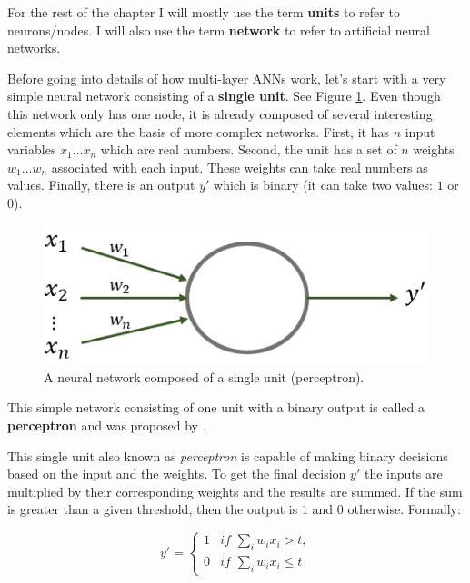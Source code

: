 \documentclass[
  11pt,
]{krantz}
\makeatletter
\newenvironment{kframe}{%
\medskip{}
\setlength{\fboxsep}{.8em}
 \def\at@end@of@kframe{}%
 \ifinner\ifhmode%
  \def\at@end@of@kframe{\end{minipage}}%
  \begin{minipage}{\columnwidth}%
 \fi\fi%
 \def\FrameCommand##1{\hskip\@totalleftmargin \hskip-\fboxsep
 \colorbox{shadecolor}{##1}\hskip-\fboxsep
     \hskip-\linewidth \hskip-\@totalleftmargin \hskip\columnwidth}%
 \MakeFramed {\advance\hsize-\width
   \@totalleftmargin\z@ \linewidth\hsize
   \@setminipage}}%
 {\par\unskip\endMakeFramed%
 \at@end@of@kframe}
\newenvironment{rmdblock}[1]
  {
  \begin{itemize}
  \renewcommand{\labelitemi}{
    \raisebox{-.7\height}[0pt][0pt]{
      {\setkeys{Gin}{width=3em,keepaspectratio}\texttt{[image: images/icons/\#1]}}
    }
  }
  \setlength{\fboxsep}{1em}
  \begin{kframe}
  \item
  }
  {
  \end{kframe}
  \end{itemize}
  }
\newenvironment{rmdinfo}
  {\begin{rmdblock}{info}}
  {\end{rmdblock}}
\makeatother
\begin{document}
\begin{rmdinfo}
For the rest of the chapter I will mostly use the term \textbf{units} to refer to neurons/nodes. I will also use the term \textbf{network} to refer to artificial neural networks.
\end{rmdinfo}

Before going into details of how multi-layer ANNs work, let's start with a very simple neural network consisting of a \textbf{single unit}. See Figure \ref{fig:nnPerceptron}. Even though this network only has one node, it is already composed of several interesting elements which are the basis of more complex networks. First, it has \(n\) input variables \(x_1 \ldots x_n\) which are real numbers. Second, the unit has a set of \(n\) weights \(w_1 \ldots w_n\) associated with each input. These weights can take real numbers as values. Finally, there is an output \(y'\) which is binary (it can take two values: \(1\) or \(0\)).

\begin{figure}

{\centering \includegraphics[width=0.5\linewidth]{images/nn_perceptron} 

}

\caption{A neural network composed of a single unit (perceptron).}\label{fig:nnPerceptron}
\end{figure}

\begin{rmdinfo}
This simple network consisting of one unit with a binary output is called a \textbf{perceptron} and was proposed by \citet{rosenblatt1958}.
\end{rmdinfo}

This single unit also known as \emph{perceptron} is capable of making binary decisions based on the input and the weights. To get the final decision \(y'\) the inputs are multiplied by their corresponding weights and the results are summed. If the sum is greater than a given threshold, then the output is \(1\) and \(0\) otherwise. Formally:

\begin{equation}
  y' =
 \begin{cases}
  1 & \textit{if } \sum_{i}{w_i x_i > t}, \\
  0 & \textit{if } \sum_{i}{w_i x_i \leq t}
 \end{cases}
  \label{eq:perceptron}
\end{equation}
\end{document}
